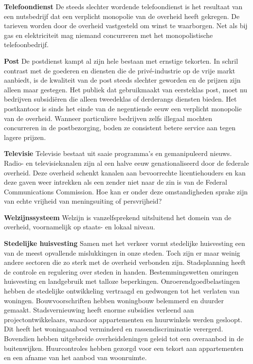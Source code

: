 \documentclass[
  a5paper,
  smalldemyvopaper,10pt,twoside,onecolumn,openright,extrafontsizes,hidelinks]{memoir}
\begin{document}
\textbf{Telefoondienst} De steeds slechter wordende telefoondienst is
het resultaat van een nutsbedrijf dat een verplicht monopolie van de
overheid heeft gekregen. De tarieven worden door de overheid vastgesteld
om winst te waarborgen. Net als bij gas en elektriciteit mag niemand
concurreren met het monopolistische telefoonbedrijf.

\textbf{Post} De postdienst kampt al zijn hele bestaan met ernstige
tekorten. In schril contrast met de goederen en diensten die de
privé-industrie op de vrije markt aanbiedt, is de kwaliteit van de post
steeds slechter geworden en de prijzen zijn alleen maar gestegen. Het
publiek dat gebruikmaakt van eersteklas post, moet nu bedrijven
subsidiëren die alleen tweedeklas of derderangs diensten bieden. Het
postkantoor is sinds het einde van de negentiende eeuw een verplicht
monopolie van de overheid. Wanneer particuliere bedrijven zelfs illegaal
mochten concurreren in de postbezorging, boden ze consistent betere
service aan tegen lagere prijzen.

\textbf{Televisie} Televisie bestaat uit saaie programma's en
gemanipuleerd nieuws. Radio- en televisiekanalen zijn al een halve eeuw
genationaliseerd door de federale overheid. Deze overheid schenkt
kanalen aan bevoorrechte licentiehouders en kan deze gaven weer
intrekken als een zender niet naar de zin is van de Federal
Communications Commission. Hoe kan er onder deze omstandigheden sprake
zijn van echte vrijheid van meningsuiting of persvrijheid?

\textbf{Welzijnssysteem} Welzijn is vanzelfsprekend uitsluitend het
domein van de overheid, voornamelijk op staats- en lokaal niveau.

\textbf{Stedelijke huisvesting} Samen met het verkeer vormt stedelijke
huisvesting een van de meest opvallende mislukkingen in onze steden.
Toch zijn er maar weinig andere sectoren die zo sterk met de overheid
verbonden zijn. Stadsplanning heeft de controle en regulering over
steden in handen. Bestemmingswetten omringen huisvesting en landgebruik
met talloze beperkingen. Onroerendgoedbelastingen hebben de stedelijke
ontwikkeling vertraagd en gedwongen tot het verlaten van woningen.
Bouwvoorschriften hebben woningbouw belemmerd en duurder gemaakt.
Stadsvernieuwing heeft enorme subsidies verleend aan
projectontwikkelaars, waardoor appartementen en huurwinkels werden
gesloopt. Dit heeft het woningaanbod verminderd en rassendiscriminatie
verergerd. Bovendien hebben uitgebreide overheidsleningen geleid tot een
overaanbod in de buitenwijken. Huurcontroles hebben gezorgd voor een
tekort aan appartementen en een afname van het aanbod van woonruimte.
\end{document}
